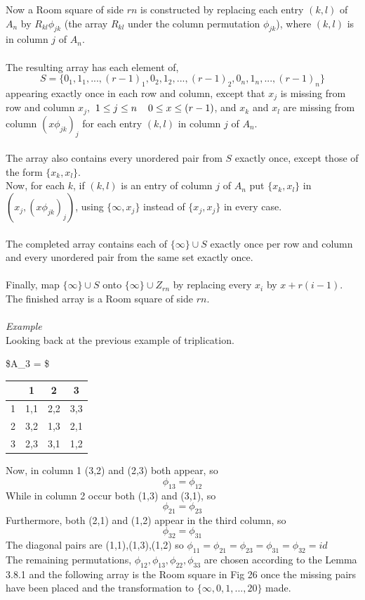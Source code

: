 \documentclass[
  12pt,
  a4paper]{book}
\begin{document}
Now a Room square of side \(rn\) is constructed by replacing each entry
\((k,l)\) of \(A_n\) by \(R_{kl} \phi _{jk}\) (the array \(R_{kl}\)
under the column permutation \(\phi _{jk}\)), where \((k,l)\) is in
column \(j\) of \(A_n\).\\
~\\
The resulting array has each element of,
\[S = \{0_1,1_1,...,(r-1)_1,0_2,1_2,...,(r-1)_2,0_n,1_n,...,(r-1)_n\}\]
appearing exactly once in each row and column, except that \(x_j\) is
missing from row and column \(x_j,\)
\(1 \leq j \leq n \hspace{0.4cm} 0 \leq x \leq (r-1)\), and \(x_k\) and
\(x_l\) are missing from column \((x \phi _{jk})_j\) for each entry
\((k,l)\) in column \(j\) of \(A_n\).\\
~\\
The array also contains every unordered pair from \(S\) exactly once,
except those of the form \(\{x_k,x_l\}\).\\
Now, for each \(k\), if \((k,l)\) is an entry of column \(j\) of \(A_n\)
put \(\{x_k,x_l\}\) in \((x_j,(x \phi _{jk})_j)\), using
\(\{\infty, x_j\}\) instead of \(\{x_j,x_j\}\) in every case.\\
~\\
The completed array contains each of \(\{\infty\} \cup S\) exactly once
per row and column and every unordered pair from the same set exactly
once.\\
~\\
Finally, map \(\{\infty\} \cup S\) onto \(\{\infty \} \cup Z_{rn}\) by
replacing every \(x_i\) by \(x+r(i-1)\). The finished array is a Room
square of side \(rn\).\\
~\\
\emph{Example}\\
Looking back at the previous example of triplication.

\$A\_3 = \$

\begin{longtable}[]{@{}lccc@{}}
\toprule
& 1 & 2 & 3\tabularnewline
\midrule
\endhead
1 & 1,1 & 2,2 & 3,3\tabularnewline
2 & 3,2 & 1,3 & 2,1\tabularnewline
3 & 2,3 & 3,1 & 1,2\tabularnewline
\bottomrule
\end{longtable}

Now, in column 1 (3,2) and (2,3) both appear, so
\[\phi _{13} = \phi _{12}\] While in column 2 occur both (1,3) and
(3,1), so \[\phi _{21} = \phi _{23}\] Furthermore, both (2,1) and (1,2)
appear in the third column, so \[\phi _{32} = \phi _{31}\] The diagonal
pairs are (1,1),(1,3),(1,2) so
\(\phi _{11}=\phi _{21}=\phi _{23}=\phi _{31}=\phi _{32}=id\)\\
The remaining permutations,
\(\phi _{12},\phi _{13},\phi _{22},\phi _{33}\) are chosen according to
the Lemma 3.8.1 and the following array is the Room square in Fig 26
once the missing pairs have been placed and the transformation to
\(\{\infty, 0, 1, ..., 20\}\) made.
\end{document}
